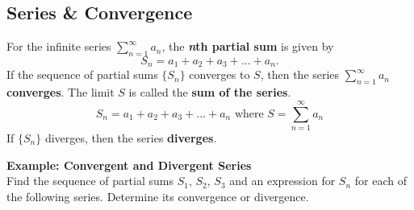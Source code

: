 \documentclass[addpoints, 12pt]{exam}
\begin{document}
\newpage
{}
\subsection*{Series \& Convergence}


\begin{tcolorbox}[title= DEFINITION OF CONVERGENT AND DIVERGENT SERIES,black,sharp corners,colback=white,colbacktitle=white,coltitle=black]

    For the infinite series $\displaystyle\sum_{n=1}^{\infty}a_n$, the \textbf{\textit{n}th partial sum} is given by
    \[S_n=a_1+a_2+a_3+...+a_n.\]
    If the sequence of partial sums $\{S_n\}$ converges to $S$, then the series $\displaystyle\sum_{n=1}^{\infty}a_n$ \textbf{converges}. The limit $S$ is called the \textbf{sum of the series}. 
    \[S_n=a_1+a_2+a_3+...+a_n \text{   where   }S=\sum_{n=1}^{\infty}a_n\]
    If $\{S_n\}$ diverges, then the series \textbf{diverges}.

\end{tcolorbox}
\vspace{.1in}

\noindent\textbf{Example: Convergent and Divergent Series}\\
Find the sequence of partial sums $S_1,\, S_2,\, S_3$ and an expression for $S_n$ for each of the following series. Determine its convergence or divergence.
\end{document}
